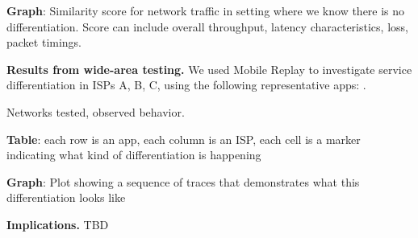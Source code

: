\textbf{Graph}: Similarity score for network traffic in setting where we know there is no differentiation. 
Score can include overall throughput, latency characteristics, loss, packet timings.

\noindent\textbf{Results from wide-area testing.} We used Mobile Replay to investigate service differentiation in 
ISPs A, B, C,  using the following representative apps: . 
 
Networks tested, observed behavior.

\textbf{Table}: each row is an app, each column is an ISP, each cell is a marker indicating what kind of 
differentiation is happening

\textbf{Graph}: Plot showing a sequence of traces that demonstrates what this differentiation looks like


\noindent\textbf{Implications.}  TBD 
